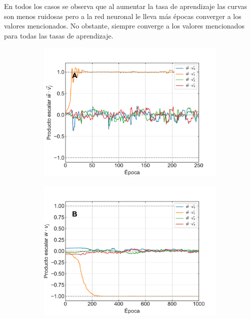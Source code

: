 \documentclass[11pt,twocolumn,twoside]{opticajnl}
\begin{document}
En todos los casos se observa que al aumentar la tasa de aprendizaje las curvas son menos ruidosas pero a la red neuronal le lleva más épocas converger a los valores mencionados. No obstante, siempre converge a los valores mencionados para todas las tasas de aprendizaje.

\begin{figure}[h]
    \centering
         \begin{subfigure}[b]{0.49\linewidth}
            \centering
            \includegraphics[width=1.1\textwidth]{Figuras/prodesc_lr_0.01.pdf}
         \end{subfigure}
         \begin{subfigure}[b]{0.49\linewidth}
            \centering
            \includegraphics[width=1.1\textwidth]{Figuras/prodesc_lr_0.001.pdf}

\end{subfigure}
\end{figure}
\end{document}
